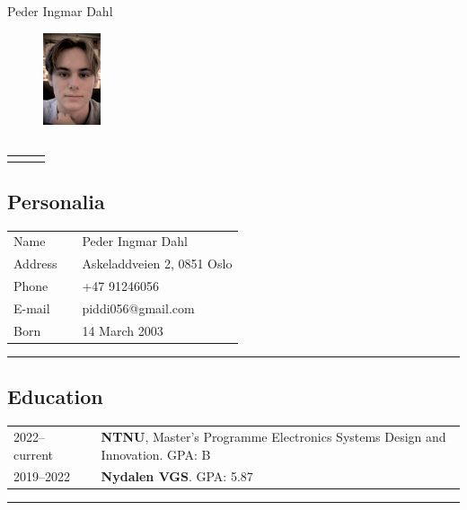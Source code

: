 \documentclass[10pt]{article}
\newlength{\cw}
\newlength{\cwl}
\begin{document}
\begin{center}
\Large{Peder Ingmar Dahl}
\end{center}



\begin{figure}
  \begin{center}
    \includegraphics[width=0.15\textwidth]{Vedlegg/IMG_1433_mod.jpg}
  \end{center}
\end{figure}

\subsection*{}
\begin{tabular}{p{\cw} @{ }l p{\cwl}}
 & & \\ 
\end{tabular}
\vspace{0.2cm}

\subsection*{Personalia}
\begin{tabular}{p{\cw} @{:}l p{\cwl}}
Name & & Peder Ingmar Dahl \\
Address & & Askeladdveien 2, 0851 Oslo\\
Phone & & +47 91246056\\ 
E-mail & & piddi056@gmail.com \\
Born & & 14 March 2003 
\end{tabular}
\vspace{0.1cm}
\hrule
\vspace{0.1cm}

\subsection*{Education}
\begin{tabular}{p{\cw} @{:}l p{\cwl}}
  2022--current & & \textbf{NTNU}, Master's Programme Electronics Systems Design and Innovation. GPA: B \\
  2019--2022 & & \textbf{Nydalen VGS}. GPA: 5.87 \\ 
\end{tabular}
\vspace{0.1cm}
\hrule
\vspace{0.1cm}
\end{document}
